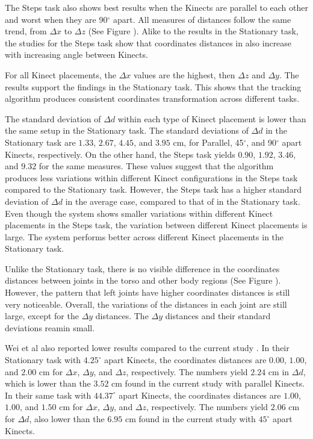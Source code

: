 The Steps task also shows best results when the Kinects are parallel to each other and worst when they are 90$^{\circ}$ apart. All measures of distances follow the same trend, from $\Delta x$ to $\Delta z$ (See Figure ). Alike to the results in the Stationary task, the studies for the Steps task show that coordinates distances in also increase with increasing angle between Kinects.

For all Kinect placements, the $\Delta x$ values are the highest, then $\Delta z$ and $\Delta y$. The results support the findings in the Stationary task. This shows that the tracking algorithm produces consistent coordinates transformation across different tasks.

The standard deviation of $\Delta d$ within each type of Kinect placement is lower than the same setup in the Stationary task. The standard deviations of $\Delta d$ in the Stationary task are $1.33$, $2.67$, $4.45$, and $3.95$ cm, for Parallel, 45$^{\circ}$, and 90$^{\circ}$ apart Kinects, respectively. On the other hand, the Steps task yields $0.90$, $1.92$, $3.46$, and $9.32$ for the same measures. These values suggest that the algorithm produces less variations within different Kinect configurations in the Steps task compared to the Stationary task. However, the Steps task has a higher standard deviation of $\Delta d$ in the average case, compared to that of in the Stationary task. Even though the system shows smaller variations within different Kinect placements in the Steps task, the variation between different Kinect placements is large. The system performs better across different Kinect placements in the Stationary task.

Unlike the Stationary task, there is no visible difference in the coordinates distances between joints in the torso and other body regions (See Figure ). However, the pattern that left joints have higher coordinates distances is still very noticeable. Overall, the variations of the distances in each joint are still large, except for the $\Delta y$ distances. The $\Delta y$ distances and their standard deviations reamin small.

Wei et al also reported lower results compared to the current study \cite{wei_kinect_calibration}. In their Stationary task with $4.25^{\circ}$ apart Kinects, the coordinates distances are $0.00$, $1.00$, and $2.00$ cm for $\Delta x$, $\Delta y$, and $\Delta z$, respectively. The numbers yield $2.24$ cm in $\Delta d$, which is lower than the $3.52$ cm found in the current study with parallel Kinects. In their same task with $44.37^{\circ}$ apart Kinects, the coordinates distances are $1.00$, $1.00$, and $1.50$ cm for $\Delta x$, $\Delta y$, and $\Delta z$, respectively. The numbers yield $2.06$ cm for $\Delta d$, also lower than the $6.95$ cm found in the current study with $45^{\circ}$ apart Kinects.

